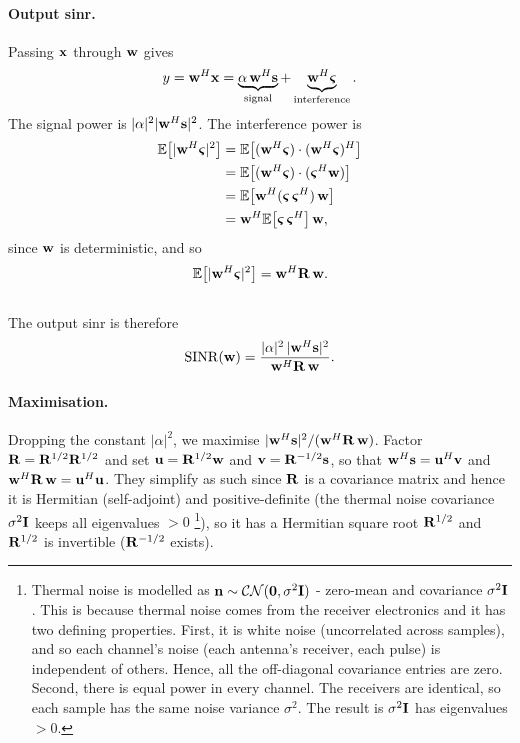 \documentclass{article}
\begin{document}
\paragraph{Output \Gls{sinr}.}
Passing $\vb x$ through $\vb w$ gives
\[
  y = \vb w^H\vb x
    = \underbrace{\alpha\,\vb w^H\vb s}_{\text{signal}}
    + \underbrace{\vb w^H\boldsymbol{\varsigma}}_{\text{interference}}.
\]
The signal power is $|\alpha|^2|\vb w^H\vb s|^2$. The interference power is 
\begin{align}
    \mathbb{E}\!\left[|\vb w^H\boldsymbol{\varsigma}|^2\right] &= \mathbb{E}\!\left[(\vb w^H\boldsymbol{\varsigma})\cdot(\vb w^H\boldsymbol{\varsigma})^H\right] \nonumber\\
    &= \mathbb{E}\!\left[(\vb w^H\boldsymbol{\varsigma})\cdot(\boldsymbol{\varsigma}^H\vb w)\right] \nonumber\\
    &= \mathbb{E}\!\left[\vb w^H(\boldsymbol{\varsigma}\,\boldsymbol{\varsigma}^H)\,\vb w\right] \nonumber\\
    &= \vb w^H \mathbb{E}\!\left[\boldsymbol{\varsigma}\,\boldsymbol{\varsigma}^H\right] \vb w, \nonumber
\end{align}
since $\vb w$ is deterministic, and so 
$$\mathbb{E}\!\left[|\vb w^H\boldsymbol{\varsigma}|^2\right] = \vb w^H\vb R\,\vb w.$$ \\

The output \gls{sinr} is therefore
\[
  \mathrm{SINR}(\vb w) = \frac{|\alpha|^2\,|\vb w^H\vb s|^2}{\vb w^H\vb R\,\vb w}.
\]

\paragraph{Maximisation.}
Dropping the constant $|\alpha|^2$, we maximise $|\vb w^H\vb s|^2/(\vb w^H\vb R\,\vb w)$.
Factor $\vb R = \vb R^{1/2}\vb R^{1/2}$ and set $\vb u = \vb R^{1/2}\vb w$ and
$\vb v = \vb R^{-1/2}\vb s$, so that $\vb w^H\vb s = \vb u^H\vb v$ and
$\vb w^H\vb R\,\vb w = \vb u^H\vb u$. They simplify as such since $\mathbf{R}$ is a covariance matrix and hence it is Hermitian (self-adjoint) and positive-definite (the thermal noise covariance $\sigma^2\mathbf{I}$ keeps all eigenvalues $> 0$ \footnote{Thermal noise is modelled as $\vb n\sim\mathcal{CN}(\vb 0, \sigma^2\mathbf{I})$ - zero-mean and covariance $\sigma^2\mathbf{I}$. This is because thermal noise comes from the receiver electronics and it has two defining properties. First, it is white noise (uncorrelated across samples), and so each channel's noise (each antenna's receiver, each pulse) is independent of others. Hence, all the off-diagonal covariance entries are zero. Second, there is equal power in every channel. The receivers are identical, so each sample has the same noise variance $\sigma^2$. The result is $\sigma^2 \mathbf{I}$ has eigenvalues $>0$.}), so it has a Hermitian square root $\mathbf{R}^{1/2}$ and $\mathbf{R}^{1/2}$ is invertible ($\mathbf{R}^{-1/2}$ exists). \\
\end{document}

